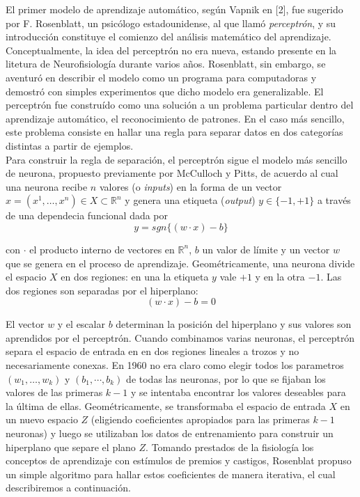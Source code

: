 \documentclass{article}
\begin{document}
El primer modelo de aprendizaje automático, según Vapnik en [2], fue sugerido por F. Rosenblatt, un psicólogo estadounidense, al que llamó \textit{perceptrón}, y su introducción
constituye el comienzo del análisis matemático del aprendizaje. Conceptualmente, la idea del perceptrón no era nueva, estando presente en la litetura de Neurofisiología durante
varios años. Rosenblatt, sin embargo, se aventuró en describir el modelo como un programa para computadoras y demostró con simples experimentos que dicho modelo era generalizable.
El perceptrón fue construído como una solución a un problema particular dentro del aprendizaje automático, el reconocimiento de patrones. En el caso más sencillo, este problema
consiste en hallar una regla para separar datos en dos categorías distintas a partir de ejemplos.\\

Para construir la regla de separación, el perceptrón sigue el modelo más sencillo de neurona, propuesto previamente por McCulloch y Pitts, de acuerdo al cual una neurona recibe
\(n\) valores (o \textit{inputs}) en la forma de un vector \(x = (x^1,\dots, x^n) \in X \subset \mathbb{R}^n \) y genera una etiqueta (\textit{output}) 
\(y\in\{-1,+1\}\) a través de una dependecia funcional dada por
\[
y = sgn\{(w\cdot x)-b\}
\]

con \(\cdot\) el producto interno de vectores en \(\mathbb{R}^n\), \(b\) un valor de límite y un vector \(w\) que se genera en el proceso de aprendizaje. Geométricamente, una 
neurona divide el espacio \(X\) en dos regiones: en una la etiqueta \(y\) vale \(+1\) y en la otra \(-1\). Las dos regiones son separadas por el hiperplano:
\[
(w\cdot x) - b = 0
\]


El vector \(w\) y el escalar \(b\) determinan la posición del hiperplano y sus valores son aprendidos por el perceptrón. Cuando combinamos varias neuronas, el perceptrón
separa el espacio de entrada en en dos regiones lineales a trozos y no necesariamente conexas. En 1960 no era claro como elegir todos los parametros \((w_1,\dots,w_k)\) y
\((b_1,\cdots, b_k)\) de todas las neuronas, por lo que se fijaban los valores de las primeras \(k-1\) y se intentaba encontrar los valores deseables para la última
de ellas. Geométricamente, se transformaba el espacio de entrada $X$ en un nuevo espacio $Z$ (eligiendo coeficientes apropiados para las primeras $k-1$ neuronas) y luego
se utilizaban los datos de entrenamiento para construir un hiperplano que separe el plano $Z$.
Tomando prestados de la fisiología los conceptos de aprendizaje con estímulos de premios y castigos, Rosenblat propuso un simple algoritmo para hallar estos 
coeficientes de manera iterativa, el cual describiremos a continuación.
\end{document}
